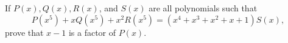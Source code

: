 If $ P(x),Q(x),R(x)$,  and $ S(x)$ are all polynomials such that \[ P(x^5)+xQ(x^5)+x^2R(x^5)=(x^4+x^3+x^2+x+1)S(x),\] prove that $ x-1$ is a factor of $ P(x)$.
